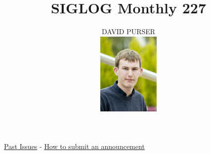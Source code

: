 \documentclass[prodmode,acmtecs]{acmsmall} %
\newcounter{colstart}
\begin{document}
\setcounter{colstart}{\thepage}

\title{\huge\sc SIGLOG Monthly 227}
\author{DAVID PURSER
\vspace*{-2.6cm}\begin{flushright}\includegraphics[width=30mm]{dp}\end{flushright}
}

\maketitlee

\href{https://lics.siglog.org/newsletters/}{Past Issues}
 - 
\href{https://lics.siglog.org/newsletters/inst.html}{How to submit an announcement}
\end{document}
